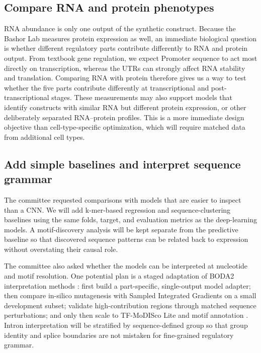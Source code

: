 \documentclass[11pt]{article}
\begin{document}
\subsection{Compare RNA and protein phenotypes}

RNA abundance is only one output of the synthetic construct. Because the Bashor
Lab measures protein expression as well, an immediate biological question is
whether different regulatory parts contribute differently to RNA and protein
output. From textbook gene regulation, we expect Promoter sequence to act most
directly on transcription, whereas the UTRs can strongly affect RNA stability
and translation. Comparing RNA with protein therefore gives us a way to test
whether the five parts contribute differently at transcriptional and
post-transcriptional stages. These measurements may also support models that
identify constructs with similar RNA but different protein expression, or
other deliberately separated RNA--protein profiles. This is a more immediate
design objective than cell-type-specific optimization, which will require
matched data from additional cell types.

\subsection{Add simple baselines and interpret sequence grammar}

The committee requested comparisons with models that are easier to inspect than
a CNN. We will add k-mer-based regression and sequence-clustering baselines
using the same folds, target, and evaluation metrics as the deep-learning
models. A motif-discovery analysis will be kept separate from the predictive
baseline so that discovered sequence patterns can be related back to expression
without overstating their causal role.

The committee also asked whether the models can be interpreted at nucleotide
and motif resolution. One potential plan is a staged adaptation of BODA2
interpretation methods \cite{gosai2024coda}: first build a part-specific,
single-output model adapter; then compare in-silico mutagenesis with Sampled
Integrated Gradients on a small development subset; validate high-contribution
regions through matched sequence perturbations; and only then scale to
TF-MoDISco Lite and motif annotation
\cite{sundararajan2017ig,shrikumar2018tfmodisco}. Intron interpretation will be
stratified by sequence-defined group so that group identity and splice
boundaries are not mistaken for fine-grained regulatory grammar.
\end{document}
